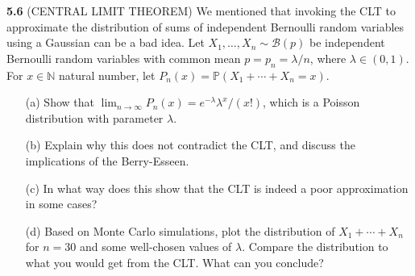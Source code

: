 \noindent\textbf{5.6} (CENTRAL LIMIT THEOREM) We mentioned that invoking the CLT to approximate the distribution of sums of independent Bernoulli random variables using a Gaussian can be a bad idea. Let $X_{1}, \ldots, X_{n} \sim \mathcal{B}(p)$ be independent Bernoulli random variables with common mean $p=p_{n}=\lambda / n$, where $\lambda \in(0,1)$. For $x \in \mathbb{N}$ natural number, let $P_{n}(x)=\mathbb{P}\left(X_{1}+\cdots+X_{n}=x\right)$.
\begin{enumerate}
	\item [(a)] Show that $\lim _{n \rightarrow \infty} P_{n}(x)=e^{-\lambda} \lambda^{x} /(x !)$, which is a Poisson distribution with parameter $\lambda$.
	\item [(b)] Explain why this does not contradict the CLT, and discuss the implications of the Berry-Esseen.
	\item [(c)] In what way does this show that the CLT is indeed a poor approximation in some cases?
	\item [(d)] Based on Monte Carlo simulations, plot the distribution of $X_{1}+\cdots+X_{n}$ for $n=30$ and some well-chosen values of $\lambda$. Compare the distribution to what you would get from the CLT. What can you conclude?
\end{enumerate}

